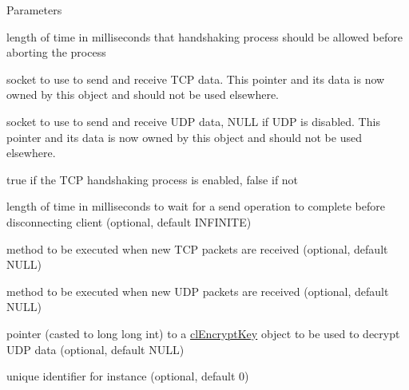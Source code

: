 \begin{DoxyParams}{Parameters}
\item[{\em p\_\-connectTimeout}]length of time in milliseconds that handshaking process should be allowed before aborting the process \item[\mbox{\tt[in]} {\em p\_\-socketTCP}]socket to use to send and receive TCP data. This pointer and its data is now owned by this object and should not be used elsewhere. \item[\mbox{\tt[in]} {\em p\_\-socketUDP}]socket to use to send and receive UDP data, NULL if UDP is disabled. This pointer and its data is now owned by this object and should not be used elsewhere. \item[{\em p\_\-handshakeEnabled}]true if the TCP handshaking process is enabled, false if not \item[{\em p\_\-sendTimeout}]length of time in milliseconds to wait for a send operation to complete before disconnecting client (optional, default INFINITE) \item[\mbox{\tt[in]} {\em p\_\-recvFuncTCP}]method to be executed when new TCP packets are received (optional, default NULL) \item[\mbox{\tt[in]} {\em p\_\-recvFuncUDP}]method to be executed when new UDP packets are received (optional, default NULL) \item[{\em p\_\-decryptKey}]pointer (casted to long long int) to a \hyperlink{classcl_encrypt_key}{clEncryptKey} object to be used to decrypt UDP data (optional, default NULL) \item[{\em p\_\-instanceID}]unique identifier for instance (optional, default 0) \end{DoxyParams}

